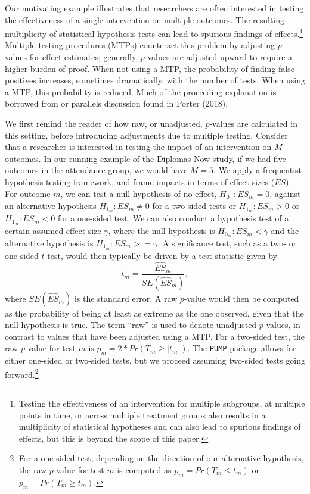 \documentclass[
]{article}
\begin{document}
Our motivating example illustrates that researchers are often interested
in testing the effectiveness of a single intervention on multiple
outcomes. The resulting multiplicity of statistical hypothesis tests can
lead to spurious findings of
effects.\footnote{Testing the effectiveness of an intervention for multiple subgroups, at multiple points in time, or across multiple treatment groups also results in a multiplicity of statistical hypotheses and can also lead to spurious findings of effects, but this is beyond the scope of this paper.}
Multiple testing procedures (MTPs) counteract this problem by adjusting
\(p\)-values for effect estimates; generally, \(p\)-values are adjusted
upward to require a higher burden of proof. When not using a MTP, the
probability of finding false positives increases, sometimes
dramatically, with the number of tests. When using a MTP, this
probability is reduced. Much of the proceeding explanation is borrowed
from or parallels discussion found in Porter (2018).

We first remind the reader of how raw, or unadjusted, \(p\)-values are
calculated in this setting, before introducing adjustments due to
multiple testing. Consider that a researcher is interested in testing
the impact of an intervention on \(M\) outcomes. In our running example
of the Diplomas Now study, if we had five outcomes in the attendance
group, we would have \(M = 5\). We apply a frequentist hypothesis
testing framework, and frame impacts in terms of effect sizes (\(ES\)).
For outcome \(m\), we can test a null hypothesis of no effect,
\(H_{0_m}: ES_m = 0\), against an alternative hypothesis
\(H_{1_m}: ES_m \neq 0\) for a two-sided tests or \(H_{1_m}: ES_m > 0\)
or \(H_{1_m}: ES_m < 0\) for a one-sided test. We can also conduct a
hypothesis test of a certain assumed effect size \(\gamma\), where the
null hypothesis is \(H_{0_m}: ES_m < \gamma\) and the alternative
hypothesis is \(H_{1_m}: ES_m >= \gamma\). A significance test, such as
a two- or one-sided \(t\)-test, would then typically be driven by a test
statistic given by \begin{equation}
t_m = \frac{\widehat{ES}_m}{SE(\hat{ES}_m)},
\end{equation} where \(SE(\hat{ES}_m)\) is the standard error. A raw
\(p\)-value would then be computed as the probability of being at least
as extreme as the one observed, given that the null hypothesis is true.
The term ``raw'' is used to denote unadjusted \(p\)-values, in contrast
to values that have been adjusted using a MTP. For a two-sided test, the
raw \(p\)-value for test \(m\) is \(p_m=2*Pr(T_m \geq |t_m|)\). The
\texttt{PUMP} package allows for either one-sided or two-sided tests,
but we proceed assuming two-sided tests going
forward.\footnote{For a one-sided test, depending on the direction of our alternative hypothesis, the raw $p$-value for test $m$ is computed as $p_m=Pr(T_m \leq t_m)$ or $p_m=Pr(T_m \geq t_m)$.}
\end{document}
